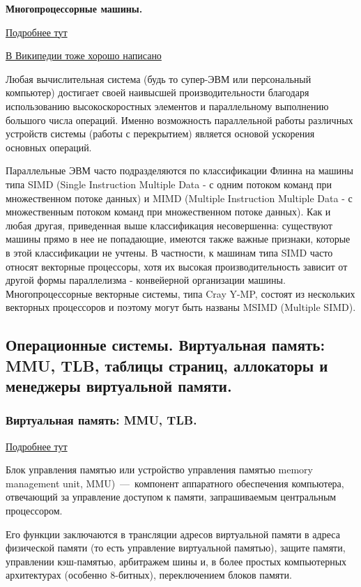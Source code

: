 \textbf{Многопроцессорные машины.}

\href{https://docstore.mik.ua/skbd/glava_10.htm}{Подробнее тут}

\href{https://ru.wikipedia.org/wiki/%D0%9C%D0%BD%D0%BE%D0%B3%D0%BE%D0%BF%D1%80%D0%BE%D1%86%D0%B5%D1%81%D1%81%D0%BE%D1%80%D0%BD%D0%BE%D1%81%D1%82%D1%8C}{В Википедии тоже хорошо написано}

Любая вычислительная система (будь то супер-ЭВМ или персональный компьютер) достигает своей наивысшей производительности благодаря использованию высокоскоростных элементов и параллельному выполнению большого числа операций. Именно возможность параллельной работы различных устройств системы (работы с перекрытием) является основой ускорения основных операций. 

Параллельные ЭВМ часто подразделяются по классификации Флинна на машины типа SIMD (Single Instruction Multiple Data - с одним потоком команд при множественном потоке данных) и MIMD (Multiple Instruction Multiple Data - с множественным потоком команд при множественном потоке данных). Как и любая другая, приведенная выше классификация несовершенна: существуют машины прямо в нее не попадающие, имеются также важные признаки, которые в этой классификации не учтены. В частности, к машинам типа SIMD часто относят векторные процессоры, хотя их высокая производительность зависит от другой формы параллелизма - конвейерной организации машины. Многопроцессорные векторные системы, типа Cray Y-MP, состоят из нескольких векторных процессоров и поэтому могут быть названы MSIMD (Multiple SIMD).

\subsection{Операционные системы. Виртуальная память: MMU, TLB, таблицы страниц, аллокаторы и менеджеры виртуальной памяти.}

\subsubsection{Виртуальная память: MMU, TLB.}

\href{https://habr.com/ru/post/211150/}{Подробнее тут}

Блок управления памятью или устройство управления памятью memory management unit, MMU)~---~компонент аппаратного обеспечения компьютера, отвечающий за управление доступом к памяти, запрашиваемым центральным процессором.

Его функции заключаются в трансляции адресов виртуальной памяти в адреса физической памяти (то есть управление виртуальной памятью), защите памяти, управлении кэш-памятью, арбитражем шины и, в более простых компьютерных архитектурах (особенно 8-битных), переключением блоков памяти. 


